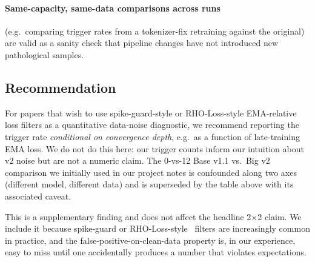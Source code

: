 \paragraph{Same-capacity, same-data comparisons across runs} (e.g.\ comparing trigger rates from a tokenizer-fix retraining against the original) are valid as a sanity check that pipeline changes have not introduced new pathological samples.

\subsection{Recommendation}

For papers that wish to use spike-guard-style or RHO-Loss-style EMA-relative loss filters as a quantitative data-noise diagnostic, we recommend reporting the trigger rate \emph{conditional on convergence depth}, e.g.\ as a function of late-training EMA loss. We do not do this here: our trigger counts inform our intuition about v2 noise but are not a numeric claim. The 0-vs-12 Base v1.1 vs.\ Big v2 comparison we initially used in our project notes is confounded along two axes (different model, different data) and is superseded by the table above with its associated caveat.

This is a supplementary finding and does not affect the headline 2$\times$2 claim. We include it because spike-guard or RHO-Loss-style~\cite{mindermann2022prioritized} filters are increasingly common in practice, and the false-positive-on-clean-data property is, in our experience, easy to miss until one accidentally produces a number that violates expectations.
